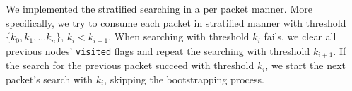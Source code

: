 We implemented the stratified searching in a per packet manner. More
specifically, we try to consume each packet in stratified manner with threshold
$\{k_0, k_1,\ldots k_n\}$, $k_i < k_{i+1}$. When searching with threshold $k_i$
fails, we clear all previous nodes' \texttt{visited} flags and repeat the
searching with threshold $k_{i+1}$. If the search for the previous packet
succeed with threshold $k_i$, we start the next packet's search with $k_i$,
skipping the bootstrapping process. 
